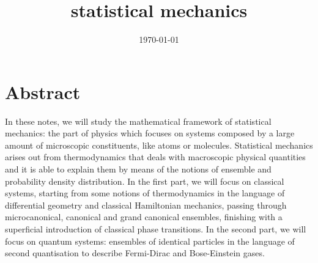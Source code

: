 \documentclass[a4paper, 12pt]{memoir}
\title{statistical mechanics}
\date{\today}
\begin{document}
\frontmatter



\tableofcontents

\mainmatter



\chapter*{Abstract}

    In these notes, we will study the mathematical framework of statistical mechanics: the part of physics which focuses on systems composed by a large amount of microscopic constituents, like atoms or molecules. Statistical mechanics arises out from thermodynamics that deals with macroscopic physical quantities and it is able to explain them by means of the notions of ensemble and probability density distribution. In the first part, we will focus on classical systems, starting from some notions of thermodynamics in the language of differential geometry and classical Hamiltonian mechanics, passing through microcanonical, canonical and grand canonical ensembles, finishing with a superficial introduction of classical phase transitions. In the second part, we will focus on quantum systems: ensembles of identical particles in the language of second quantisation to describe Fermi-Dirac and Bose-Einstein gases.
    








\backmatter

\nocite{smlecture}
\nocite{ercolessi}
\nocite{pathria}


\clearpage
{}
\printbibliography
\end{document}
